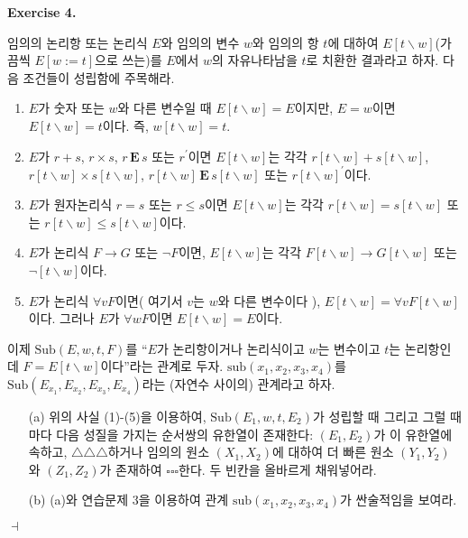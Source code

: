 \documentclass[12pt]{paper}
\newenvironment{context}[1][]
{ \noindent \textbf{{#1}.}
}
{ \hfill $ \dashv $ }
\begin{document}
\begin{context}[Exercise 4]
임의의 논리항 또는 논리식 $E$와 임의의 변수 $w$와 임의의 항 $t$에 대하여
$E \left[ t \backslash w \right]$(가끔씩 $E \left[ w := t \right]$으로 쓰는)를 $E$에서
$w$의 자유나타남을 $t$로 치환한 결과라고 하자. 다음 조건들이 성립함에 주목해라.
\begin{enumerate}
\item $E$가 숫자 또는 $w$와 다른 변수일 때 $E \left[ t \backslash w \right] = E$이지만,
$E = w$이면 $E \left[ t \backslash w \right] = t$이다. 즉, $w \left[ t \backslash w \right] = t$.
\item $E$가 $r + s$, $r \times s$, $r \, \mathbf{E} \, s$ 또는 $r^{\prime}$이면
$E \left[ t \backslash w \right]$는 각각 $r \left[ t \backslash w \right] + s \left[ t \backslash w \right]$,
$r \left[ t \backslash w \right] \times s \left[ t \backslash w \right]$, $ r \left[ t \backslash w \right] \, \mathbf{E} \, s \left[ t \backslash w \right]$ 또는 $r \left[ t \backslash w \right]^{\prime}$이다.
\item $E$가 원자논리식 $r = s$ 또는 $r \le s$이면
$E \left[ t \backslash w \right]$는 각각 $ r \left[ t \backslash w \right] = s \left[ t \backslash w \right] $ 또는 $ r \left[ t \backslash w \right] \le s \left[ t \backslash w \right] $이다.
\item $E$가 논리식 $F \rightarrow G$ 또는 $\lnot F$이면,
$E \left[ t \backslash w \right]$는 각각
$F \left[ t \backslash w \right] \rightarrow G \left[ t \backslash w \right]$ 또는
$\lnot \left[ t \backslash w \right]$이다.
\item $E$가 논리식 $\forall v F$이면( 여기서 $v$는 $w$와 다른 변수이다 ),
$E \left[ t \backslash w \right] = \forall v F \left[ t \backslash w \right]$이다.
그러나 $E$가 $\forall w F$이면 $E \left[ t \backslash w \right] = E$이다. 
\end{enumerate}
이제 $\mathrm{Sub} \left( E , w , t , F \right)$를 ``$E$가 논리항이거나 논리식이고 $w$는 변수이고 $t$는 논리항인데 $F = E\left[ t \backslash w \right]$이다''라는 관계로 두자.
$\mathrm{sub} \left( x_1, x_2, x_3, x_4 \right)$를 $\mathrm{Sub} \left( E_{x_1} , E_{x_2} , E_{x_3} , E_{x_4} \right)$라는 (자연수 사이의) 관계라고 하자.
\begin{itemize}
\item[(a)] 위의 사실 (1)-(5)을 이용하여, $\mathrm{Sub} \left( E_1, w, t, E_2 \right)$가 성립할 때 그리고 그럴 때마다
다음 성질을 가지는 순서쌍의 유한열이 존재한다:
$\left( E_1, E_2 \right)$가 이 유한열에 속하고,
$\triangle \triangle \triangle$하거나 임의의 원소 $\left( X_1, X_2 \right)$에 대하여
더 빠른 원소 $\left( Y_1 , Y_2 \right)$와 $\left( Z_1 , Z_2 \right)$가 존재하여 $\square \square \square$한다.
두 빈칸을 올바르게 채워넣어라.
\item[(b)] (a)와 연습문제 3을 이용하여 관계 $\mathrm{sub} \left( x_1 , x_2 , x_3 , x_4 \right)$가 싼술적임을 보여라.
\end{itemize}
\end{context}
\end{document}
